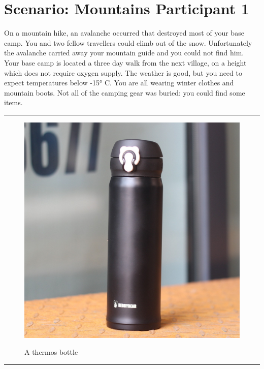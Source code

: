 \documentclass{article}
\begin{document}
    \section*{Scenario: \textmd{Mountains} \hfill Participant \textmd{1}}
    \Large On a mountain hike, an avalanche occurred that destroyed most of your base camp. You and two fellow travellers could climb out of the snow. Unfortunately the avalanche carried away your mountain guide and you could not find him. Your base camp is located a three day walk from the next village, on a height which does not require oxygen supply. The weather is good, but you need to expect temperatures below -15° C. You are all wearing winter clothes and mountain boots. Not all of the camping gear was buried: you could find some items.\clearpage
        \par\noindent\rule{\textwidth}{0.4pt}
    \begin{figure}[H]
        \centering
        \begin{minipage}{0.25\textwidth}
            \centering
            \includegraphics[width=\textwidth]{../SurvivalItemImages/thermos}
        \end{minipage}\hfill
        \begin{minipage}{0.7\textwidth}
            \centering
            \Large A thermos bottle
        \end{minipage}
    \end{figure}
    \vspace{-0.8em}
    \noindent\rule{\textwidth}{0.4pt}
            
\end{document}
